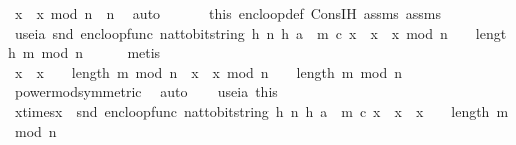 \begin{isabellebody}
\ {\isachardoublequoteopen}x\ {\isacharasterisk}{\kern0pt}\ x\ mod\ n\ {\isacharless}{\kern0pt}\ n{\isachardoublequoteclose}\ \isamarkupfalse%
\ auto\isanewline
\ \ \isanewline
\ \ \isamarkupfalse%
\ this\ enc{\isacharunderscore}{\kern0pt}loop{\isacharunderscore}{\kern0pt}def\ Cons{\isachardot}{\kern0pt}IH\ assms{\isacharparenleft}{\kern0pt}{}{\isacharparenright}{\kern0pt}\ assms{\isacharparenleft}{\kern0pt}{}{\isacharparenright}{\kern0pt}\ \isanewline
\ \ \isamarkupfalse%
\ use{\isacharunderscore}{\kern0pt}ia{\isacharcolon}{\kern0pt}\ {\isachardoublequoteopen}snd\ {\isacharparenleft}{\kern0pt}enc{\isacharunderscore}{\kern0pt}loop{\isacharunderscore}{\kern0pt}func\ {\isacharparenleft}{\kern0pt}nat{\isacharunderscore}{\kern0pt}to{\isacharunderscore}{\kern0pt}bitstring\ h{\isacharcomma}{\kern0pt}\ n{\isacharcomma}{\kern0pt}\ h{\isacharcomma}{\kern0pt}\ {\isacharparenleft}{\kern0pt}a\ {\isacharhash}{\kern0pt}\ m{\isacharparenright}{\kern0pt}{\isacharparenright}{\kern0pt}\ c\ x{\isacharparenright}{\kern0pt}\ {\isacharequal}{\kern0pt}\ {\isacharparenleft}{\kern0pt}x\ {\isacharasterisk}{\kern0pt}\ x\ mod\ n{\isacharparenright}{\kern0pt}\ {\isacharcircum}{\kern0pt}\ {\isacharparenleft}{\kern0pt}{}\ {\isacharcircum}{\kern0pt}\ length\ m{\isacharparenright}{\kern0pt}\ mod\ n{\isachardoublequoteclose}\isanewline
\ \ \ \ \isamarkupfalse%
\ metis\isanewline
\isanewline
\ \ \isamarkupfalse%
\ {\isachardoublequoteopen}{\isacharparenleft}{\kern0pt}x\ {\isacharasterisk}{\kern0pt}\ x{\isacharparenright}{\kern0pt}\ {\isacharcircum}{\kern0pt}\ {\isacharparenleft}{\kern0pt}{}\ {\isacharcircum}{\kern0pt}\ length\ m{\isacharparenright}{\kern0pt}\ mod\ n\ {\isacharequal}{\kern0pt}\ {\isacharparenleft}{\kern0pt}x\ {\isacharasterisk}{\kern0pt}\ x\ mod\ n{\isacharparenright}{\kern0pt}\ {\isacharcircum}{\kern0pt}\ {\isacharparenleft}{\kern0pt}{}\ {\isacharcircum}{\kern0pt}\ length\ m{\isacharparenright}{\kern0pt}\ mod\ n{\isachardoublequoteclose}\ \ \isanewline
\ \ \ \ \isamarkupfalse%
\ power{\isacharunderscore}{\kern0pt}mod{\isacharbrackleft}{\kern0pt}symmetric{\isacharbrackright}{\kern0pt}\ \isamarkupfalse%
\ auto\isanewline
\ \ \isamarkupfalse%
\ use{\isacharunderscore}{\kern0pt}ia\ this\ \isamarkupfalse%
\ x{\isacharunderscore}{\kern0pt}times{\isacharunderscore}{\kern0pt}x{\isacharcolon}{\kern0pt}\ \ {\isachardoublequoteopen}snd\ {\isacharparenleft}{\kern0pt}enc{\isacharunderscore}{\kern0pt}loop{\isacharunderscore}{\kern0pt}func\ {\isacharparenleft}{\kern0pt}nat{\isacharunderscore}{\kern0pt}to{\isacharunderscore}{\kern0pt}bitstring\ h{\isacharcomma}{\kern0pt}\ n{\isacharcomma}{\kern0pt}\ h{\isacharcomma}{\kern0pt}\ {\isacharparenleft}{\kern0pt}a\ {\isacharhash}{\kern0pt}\ m{\isacharparenright}{\kern0pt}{\isacharparenright}{\kern0pt}\ c\ x{\isacharparenright}{\kern0pt}\ {\isacharequal}{\kern0pt}\ {\isacharparenleft}{\kern0pt}x\ {\isacharasterisk}{\kern0pt}\ x{\isacharparenright}{\kern0pt}\ {\isacharcircum}{\kern0pt}\ {\isacharparenleft}{\kern0pt}{}\ {\isacharcircum}{\kern0pt}\ length\ m{\isacharparenright}{\kern0pt}\ mod\ n{\isachardoublequoteclose}\ \isanewline

\end{isabellebody}
